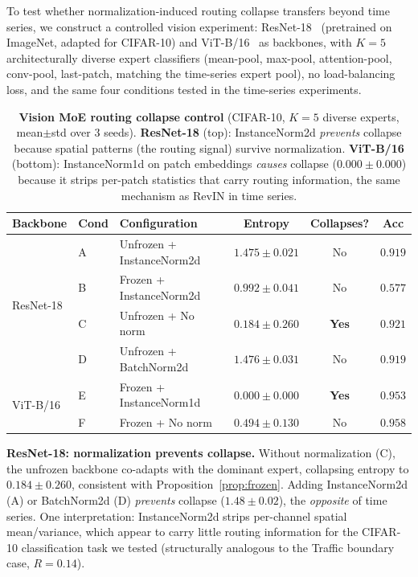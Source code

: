 \documentclass{article}
\begin{document}
To test whether normalization-induced routing collapse transfers beyond time series, we construct a controlled vision experiment: ResNet-18~\citep{he2016resnet} (pretrained on ImageNet, adapted for CIFAR-10) and ViT-B/16~\citep{dosovitskiy2021vit} as backbones, with $K{=}5$ architecturally diverse expert classifiers (mean-pool, max-pool, attention-pool, conv-pool, last-patch, matching the time-series expert pool), no load-balancing loss, and the same four conditions tested in the time-series experiments.

\begin{table}[!htbp]
\centering
\caption{\textbf{Vision MoE routing collapse control} (CIFAR-10, $K{=}5$ diverse experts, mean$\pm$std over 3 seeds). \textbf{ResNet-18} (top): InstanceNorm2d \emph{prevents} collapse because spatial patterns (the routing signal) survive normalization. \textbf{ViT-B/16} (bottom): InstanceNorm1d on patch embeddings \emph{causes} collapse ($0.000\pm0.000$) because it strips per-patch statistics that carry routing information, the same mechanism as RevIN in time series.}
\label{tab:vision_moe}
\small
\begin{tabular}{@{}lllccc@{}}
\toprule
Backbone & Cond & Configuration & Entropy & Collapses? & Acc \\
\midrule
\multirow{4}{*}{ResNet-18} & A & Unfrozen + InstanceNorm2d & $1.475 \pm 0.021$ & No & $0.919$ \\
& B & Frozen + InstanceNorm2d   & $0.992 \pm 0.041$ & No & $0.577$ \\
& C & Unfrozen + No norm        & $\mathbf{0.184 \pm 0.260}$ & \textbf{Yes} & $0.921$ \\
& D & Unfrozen + BatchNorm2d    & $1.476 \pm 0.031$ & No & $0.919$ \\
\midrule
\multirow{2}{*}{ViT-B/16} & E & Frozen + InstanceNorm1d   & $\mathbf{0.000 \pm 0.000}$ & \textbf{Yes} & $0.953$ \\
& F & Frozen + No norm          & $0.494 \pm 0.130$ & No & $0.958$ \\
\bottomrule
\end{tabular}
\end{table}

\textbf{ResNet-18: normalization prevents collapse.} Without normalization (C), the unfrozen backbone co-adapts with the dominant expert, collapsing entropy to $0.184\pm0.260$, consistent with Proposition~\ref{prop:frozen}. Adding InstanceNorm2d (A) or BatchNorm2d (D) \emph{prevents} collapse ($1.48\pm0.02$), the \emph{opposite} of time series. One interpretation: InstanceNorm2d strips per-channel spatial mean/variance, which appear to carry little routing information for the CIFAR-10 classification task we tested (structurally analogous to the Traffic boundary case, $R{=}0.14$).
\end{document}
